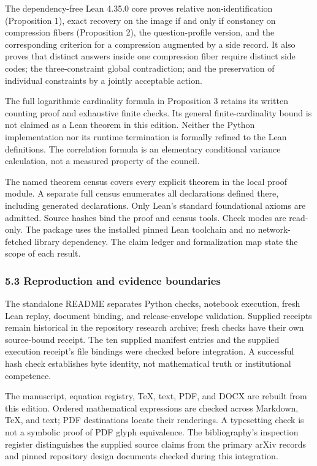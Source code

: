 \documentclass[
  10pt,
]{article}
\begin{document}
The dependency-free Lean 4.35.0 core proves relative non-identification (Proposition 1), exact recovery on the image if and only if constancy on compression fibers (Proposition 2), the question-profile version, and the corresponding criterion for a compression augmented by a side record. It also proves that distinct answers inside one compression fiber require distinct side codes; the three-constraint global contradiction; and the preservation of individual constraints by a jointly acceptable action.

The full logarithmic cardinality formula in Proposition 3 retains its written counting proof and exhaustive finite checks. Its general finite-cardinality bound is not claimed as a Lean theorem in this edition. Neither the Python implementation nor its runtime termination is formally refined to the Lean definitions. The correlation formula is an elementary conditional variance calculation, not a measured property of the council.

The named theorem census covers every explicit theorem in the local proof module. A separate full census enumerates all declarations defined there, including generated declarations. Only Lean's standard foundational axioms are admitted. Source hashes bind the proof and census tools. Check modes are read-only. The package uses the installed pinned Lean toolchain and no network-fetched library dependency. The claim ledger and formalization map state the scope of each result.

\subsubsection{5.3 Reproduction and evidence boundaries}\label{reproduction-and-evidence-boundaries}

The standalone README separates Python checks, notebook execution, fresh Lean replay, document binding, and release-envelope validation. Supplied receipts remain historical in the repository research archive; fresh checks have their own source-bound receipt. The ten supplied manifest entries and the supplied execution receipt's file bindings were checked before integration. A successful hash check establishes byte identity, not mathematical truth or institutional competence.

The manuscript, equation registry, TeX, text, PDF, and DOCX are rebuilt from this edition. Ordered mathematical expressions are checked across Markdown, TeX, and text; PDF destinations locate their renderings. A typesetting check is not a symbolic proof of PDF glyph equivalence. The bibliography's inspection register distinguishes the supplied source claims from the primary arXiv records and pinned repository design documents checked during this integration.
\end{document}
